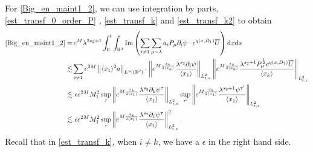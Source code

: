 \documentclass[10pt,twoside,a4paper]{article}
\numberwithin{equation}{section}\allowdisplaybreaks
\begin{document}
For \eqref{Big_en_maint1_2},  we can use integration by parts, \eqref{est_transf_0_order_P} , \eqref{est_transf_k} and \eqref{est_transf_k2} to obtain
\begin{align*}
	\eqref{Big_en_maint1_2} = &\,e^{M}\lambda^{2s_2+1}\int_0^t \int_{\mathbb{R}^d}  \mathrm{Im} \left(   \sum_{ i\neq 1} \sum_{\mu\sim \lambda} a_i  P_\mu \partial_i \psi \cdot  e^{q (x,D_1)} \overline{U}\right)  \mathrm{d} x \mathrm{d} s\\
	\lesssim& 	  \sum_{ i\neq 1}   e^{ 2M}\left\|\langle x_1\rangle^2  a  \right\|_{L^{\infty}(\mathbb{R}^d)} \cdot  \left\|e^{M \frac{x_k}{2\langle x_k\rangle} }  \frac{\lambda^{s_2}  \partial_i \psi}{\langle x_1\rangle }  \right\|_{L^2_{t,x}}   \left\|e^{M \frac{x_k}{2\langle x_k\rangle} }  \frac{\lambda^{s_2+1}P_\mu^{\frac 12}  e^{q (x,D_1)} \overline{U}}{\langle x_k\rangle }  \right\|_{L^2_{t,x}} \\
	\lesssim &\,\, \epsilon e^{ 2M} M_1^2 \sup_{\tau}   \left\| e^{M \frac{x_k}{2\langle x_1\rangle} }  \frac{\lambda^{s_2} \partial_k \psi^{\tau }}{\langle x_1\rangle } \right\|_{L^2_{t,x}}  \sup_{\tau^\prime}   \left\| e^{M \frac{x_k}{2\langle x_1\rangle} }  \frac{\lambda^{s_2+1} \psi^{\tau^\prime }}{\langle x_1\rangle } \right\|_{L^2_{t,x}}\\
	\lesssim &\,\, \epsilon e^{ 2M} M_1^2  \sup_{\tau}   \left\| e^{M \frac{x_k}{2\langle x_1\rangle} }  \frac{\lambda^{s_2} \partial_1 \psi^{\tau }}{\langle x_1\rangle } \right\|_{L^2_{t,x}}^2.  
\end{align*}
Recall that in \eqref{est_transf_k}, when \( i \neq k \),  we have  a  $ \epsilon  $ in the right hand side.
\end{document}
